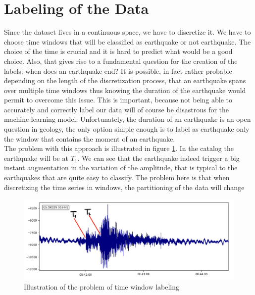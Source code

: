 \documentclass[10pt,conference,compsocconf]{IEEEtran}
\begin{document}
\section{Labeling of the Data}
Since the dataset lives in a continuous space, we have to discretize it. We have to choose time windows that will be classified as earthquake or not earthquake. The choice of the time is crucial and it is hard to predict what would be a good choice. Also, that gives rise to a fundamental question for the creation of the labels: when does an earthquake end? It is possible, in fact rather probable depending on the length of the discretization process, that an earthquake spans over multiple time windows thus knowing the duration of the earthquake would permit to overcome this issue. This is important, because not being able to accurately and correctly label our data will of course be disastrous for the machine learning model. Unfortunately, the duration of an earthquake is an open question in geology, the only option simple enough is to label as earthquake only the window that contains the moment of an earthquake.\\
The problem with this approach is illustrated in figure \ref{fig:problem-discretization}. In the catalog the earthquake will be at $T_1$. We can see that the earthquake indeed trigger a big instant augmentation in the variation of the amplitude, that is typical to the earthquakes that are quite easy to classify. The problem here is that when discretizing the time series in windows, the partitioning of the data will change

\begin{figure}[h]
  \centering
	\includegraphics[width=\columnwidth]{problem-time-window-labeling.png}
  \caption{Illustration of the problem of time window labeling}
	\label{fig:problem-discretization}
\end{figure}
\end{document}
